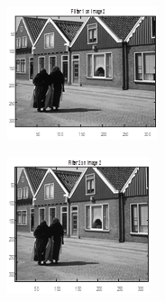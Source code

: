 \begin{figure}
    \centering
    \begin{subfigure}{0.4\textwidth}
        \includegraphics[width=\textwidth]{Resources/F10-a.png}
        \caption{}
        \label{fig:first}
    \end{subfigure}
    \hfill
    \begin{subfigure}{0.4\textwidth}
        \includegraphics[width=\textwidth]{Resources/F10-b.png}

\end{subfigure}
\end{figure}
